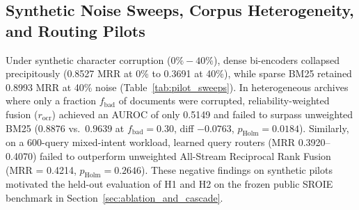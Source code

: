 \documentclass[conference]{IEEEtran}
\begin{document}
\begin{table}[h]
\centering
\small
\caption{Preliminary End-to-End Diagnostic Suite ($N=100$: 50 single-hop, 50 multi-hop queries evaluated via GPT-4o-mini).}
\label{tab:pilot_multihop}
\end{table}

\subsection{Synthetic Noise Sweeps, Corpus Heterogeneity, and Routing Pilots}
\label{sec:diagnostic_extensions}
\label{sec:coco_eval}
Under synthetic character corruption ($0\%-40\%$), dense bi-encoders collapsed precipitously (0.8527 MRR at 0\% to 0.3691 at 40\%), while sparse BM25 retained 0.8993 MRR at 40\% noise (Table~\ref{tab:pilot_sweeps}). In heterogeneous archives where only a fraction $f_{\text{bad}}$ of documents were corrupted, reliability-weighted fusion ($r_{\text{ocr}}$) achieved an AUROC of only 0.5149 and failed to surpass unweighted BM25 ($0.8876$ vs.\ $0.9639$ at $f_{\text{bad}}=0.30$, diff $-0.0763$, $p_{\text{Holm}}=0.0184$). Similarly, on a 600-query mixed-intent workload, learned query routers (MRR 0.3920--0.4070) failed to outperform unweighted All-Stream Reciprocal Rank Fusion (MRR = 0.4214, $p_{\text{Holm}}=0.2646$). These negative findings on synthetic pilots motivated the held-out evaluation of H1 and H2 on the frozen public SROIE benchmark in Section~\ref{sec:ablation_and_cascade}.
\end{document}
